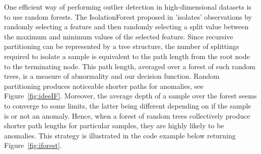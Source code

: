 One efficient way of performing outlier detection in high-dimensional datasets
is to use random forests.
%
The IsolationForest proposed in \cite{Liu2008} 'isolates' observations by randomly selecting a feature and then randomly selecting a split value between the maximum and minimum values of the selected feature.
%
Since recursive partitioning can be represented by a tree structure, the
number of splittings required to isolate a sample is equivalent to the path
length from the root node to the terminating node.
%
This path length, averaged over a forest of such random trees, is a measure
of abnormality and our decision function.
%
Random partitioning produces noticeable shorter paths for anomalies, see Figure~\ref{fig:ideeIF}. Moreover, the average depth of a sample over the forest seems to converge to some limits, the latter being different depending on if the sample is or not an anomaly.
Hence, when a forest of random trees collectively produce shorter path lengths
for particular samples, they are highly likely to be anomalies.
%
This strategy is illustrated in the code example below returning Figure~\ref{fig:iforest}.


